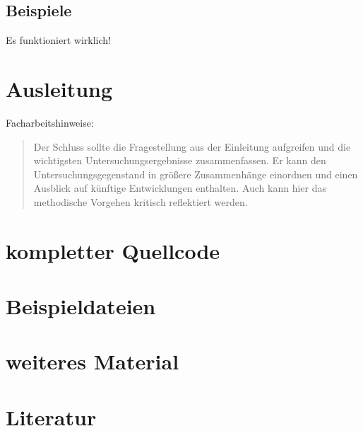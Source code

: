\documentclass[12pt]{article}
\begin{document}
\subsection{Beispiele}
Es funktioniert wirklich!

\section{Ausleitung}
Facharbeitshinweise:
\begin{quote}
Der Schluss sollte die Fragestellung aus der Einleitung aufgreifen und die wichtigsten Untersuchungsergebnisse zusammenfassen. Er kann den Untersuchungsgegenstand in größere Zusammenhänge einordnen und einen Ausblick auf künftige Entwicklungen enthalten. Auch kann hier das methodische Vorgehen kritisch reflektiert werden.
\end{quote}

\appendix

\section{kompletter Quellcode}

\section{Beispieldateien}

\section{weiteres Material}

\section{Literatur}

\renewcommand{\section}[2]{}

\end{document}
